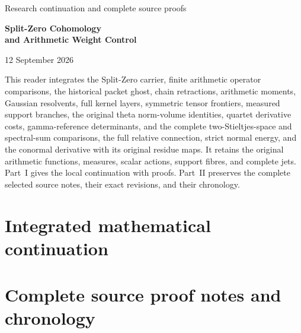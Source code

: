 \documentclass[11pt,a4paper]{article}
\theoremstyle{definition}
\theoremstyle{remark}
\begin{document}
\begin{titlepage}
\centering
\vspace*{25mm}
{\Large Research continuation and complete source proofs\par}
\vspace{12mm}
{\Huge\bfseries Split-Zero Cohomology\\[5mm]and Arithmetic Weight Control\par}
\vspace{15mm}
{\Large 12 September 2026\par}
\vfill
\begin{minipage}{0.87\textwidth}
This reader integrates the Split-Zero carrier, finite arithmetic operator
comparisons, the historical packet ghost, chain retractions, arithmetic
moments, Gaussian resolvents, full kernel layers, symmetric tensor frontiers,
measured support branches, the original theta norm-volume identities,
quartet derivative costs, gamma-reference determinants, and the complete
two-Stieltjes-space and spectral-sum comparisons, the full relative connection,
strict normal energy, and the conormal derivative with its original residue maps.
It retains the original arithmetic
functions, measures, scalar actions, support fibres, and complete jets.
Part~I gives the local continuation with proofs. Part~II preserves the
complete selected source notes, their exact revisions, and their chronology.
\end{minipage}
\vspace{22mm}
\end{titlepage}
\tableofcontents
\clearpage
\part{Integrated mathematical continuation}




























\clearpage
\part{Complete source proof notes and chronology}
\appendix
\sloppy

\end{document}
